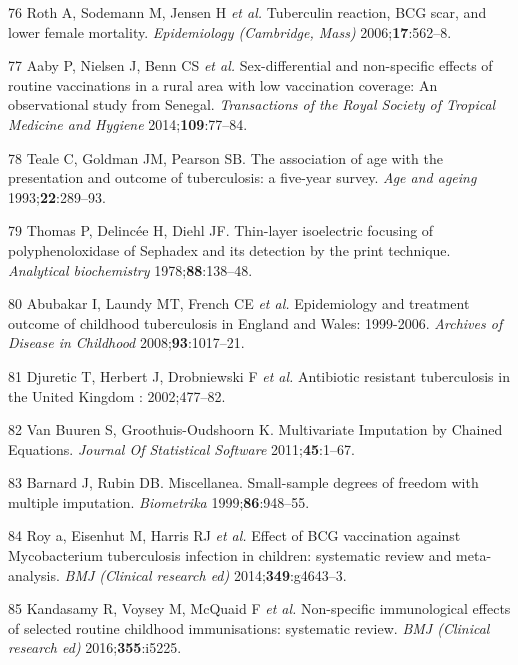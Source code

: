 \documentclass[11pt,twoside]{bristolthesis}
\begin{document}
  \leavevmode\hypertarget{ref-Roth2006a}{}%
  76 Roth A, Sodemann M, Jensen H \emph{et al.} Tuberculin reaction, BCG scar, and lower female mortality. \emph{Epidemiology (Cambridge, Mass)} 2006;\textbf{17}:562--8.
  
  \leavevmode\hypertarget{ref-Aaby2014}{}%
  77 Aaby P, Nielsen J, Benn CS \emph{et al.} Sex-differential and non-specific effects of routine vaccinations in a rural area with low vaccination coverage: An observational study from Senegal. \emph{Transactions of the Royal Society of Tropical Medicine and Hygiene} 2014;\textbf{109}:77--84.
  
  \leavevmode\hypertarget{ref-Teale1993}{}%
  78 Teale C, Goldman JM, Pearson SB. The association of age with the presentation and outcome of tuberculosis: a five-year survey. \emph{Age and ageing} 1993;\textbf{22}:289--93.
  
  \leavevmode\hypertarget{ref-DCLG2011}{}%
  79 Thomas P, Delincée H, Diehl JF. Thin-layer isoelectric focusing of polyphenoloxidase of Sephadex and its detection by the print technique. \emph{Analytical biochemistry} 1978;\textbf{88}:138--48.
  
  \leavevmode\hypertarget{ref-Abubakar2008}{}%
  80 Abubakar I, Laundy MT, French CE \emph{et al.} Epidemiology and treatment outcome of childhood tuberculosis in England and Wales: 1999-2006. \emph{Archives of Disease in Childhood} 2008;\textbf{93}:1017--21.
  
  \leavevmode\hypertarget{ref-Djuretic2002}{}%
  81 Djuretic T, Herbert J, Drobniewski F \emph{et al.} Antibiotic resistant tuberculosis in the United Kingdom : 2002;477--82.
  
  \leavevmode\hypertarget{ref-VanBuuren2011}{}%
  82 Van Buuren S, Groothuis-Oudshoorn K. Multivariate Imputation by Chained Equations. \emph{Journal Of Statistical Software} 2011;\textbf{45}:1--67.
  
  \leavevmode\hypertarget{ref-Barnard1999}{}%
  83 Barnard J, Rubin DB. Miscellanea. Small-sample degrees of freedom with multiple imputation. \emph{Biometrika} 1999;\textbf{86}:948--55.
  
  \leavevmode\hypertarget{ref-Roy2014b}{}%
  84 Roy a, Eisenhut M, Harris RJ \emph{et al.} Effect of BCG vaccination against Mycobacterium tuberculosis infection in children: systematic review and meta-analysis. \emph{BMJ (Clinical research ed)} 2014;\textbf{349}:g4643--3.
  
  \leavevmode\hypertarget{ref-Kandasamy2016}{}%
  85 Kandasamy R, Voysey M, McQuaid F \emph{et al.} Non-specific immunological effects of selected routine childhood immunisations: systematic review. \emph{BMJ (Clinical research ed)} 2016;\textbf{355}:i5225.
  
\end{document}
